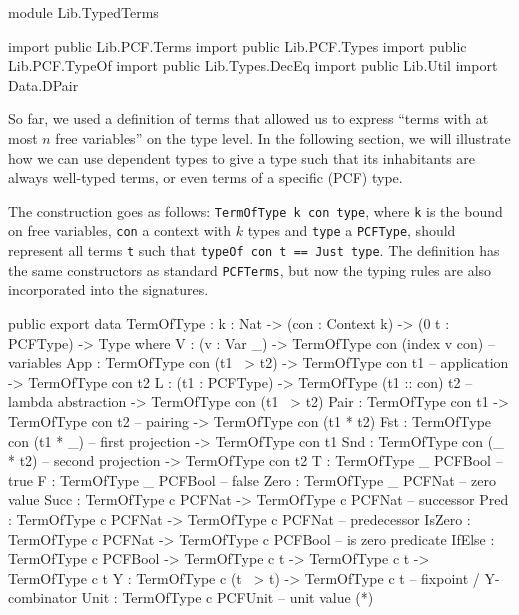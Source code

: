 \begin{hidden}
module Lib.TypedTerms

import public Lib.PCF.Terms
import public Lib.PCF.Types
import public Lib.PCF.TypeOf
import public Lib.Types.DecEq
import public Lib.Util
import Data.DPair


\end{hidden}

So far, we used a definition of terms that allowed us to express ``terms with at most $n$ free variables'' on the type level. In the following section, we will illustrate how we can use dependent types to give a type such that its inhabitants are always well-typed terms, or even terms of a specific (PCF) type.

The construction goes as follows: \lstinline{TermOfType k con type}, where \lstinline{k} is the bound on free variables, \lstinline{con} a context with $k$ types and \lstinline{type} a \lstinline{PCFType}, should represent all terms \lstinline{t} such that \lstinline{typeOf con t == Just type}.
The definition has the same constructors as standard \lstinline{PCFTerms}, but now the typing rules are also incorporated into the
signatures.

\begin{code}
public export
data TermOfType : {k : Nat} -> (con : Context k) -> (0 t : PCFType) -> Type where
    V    : (v : Var _)  -> TermOfType con (index v con)            -- variables
    App  : TermOfType con (t1 ~> t2)  -> TermOfType con t1         -- application
            -> TermOfType con t2  
    L    : (t1 : PCFType)         -> TermOfType (t1 :: con) t2     -- lambda abstraction
            -> TermOfType con (t1 ~> t2)   
    Pair : TermOfType con t1 -> TermOfType con t2                  -- pairing
            -> TermOfType con (t1 * t2)
    Fst   : TermOfType con (t1 * _)                                -- first projection
            -> TermOfType con t1
    Snd   : TermOfType con (_ * t2)                                -- second projection
            -> TermOfType con t2
    T    : TermOfType _ PCFBool                                    -- true
    F    : TermOfType _ PCFBool                                    -- false
    Zero : TermOfType _ PCFNat                                     -- zero value
    Succ : TermOfType c PCFNat -> TermOfType c PCFNat              -- successor
    Pred : TermOfType c PCFNat -> TermOfType c PCFNat              -- predecessor
    IsZero : TermOfType c PCFNat -> TermOfType c PCFBool           -- is zero predicate
    IfElse : TermOfType c PCFBool -> TermOfType c t -> TermOfType c t
                  -> TermOfType c t
    Y     : TermOfType c (t ~> t) -> TermOfType c t                -- fixpoint / Y-combinator
    Unit  : TermOfType c PCFUnit                                   -- unit value (*)
\end{code}

